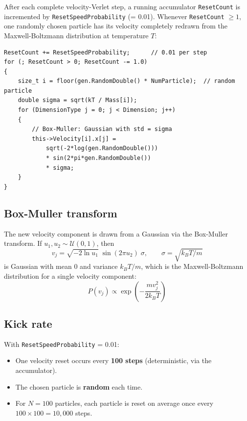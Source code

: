 \documentclass[12pt,a4paper]{article}
\begin{document}
After each complete velocity-Verlet step, a running accumulator
\texttt{ResetCount} is incremented by \texttt{ResetSpeedProbability} (= 0.01).
Whenever \texttt{ResetCount} $\geq 1$, one randomly chosen particle has
its velocity completely redrawn from the Maxwell-Boltzmann distribution
at temperature $T$:

\begin{lstlisting}
ResetCount += ResetSpeedProbability;      // 0.01 per step
for (; ResetCount > 0; ResetCount -= 1.0)
{
    size_t i = floor(gen.RandomDouble() * NumParticle);  // random particle
    double sigma = sqrt(kT / Mass[i]);
    for (DimensionType j = 0; j < Dimension; j++)
    {
        // Box-Muller: Gaussian with std = sigma
        this->Velocity[i].x[j] =
            sqrt(-2*log(gen.RandomDouble()))
            * sin(2*pi*gen.RandomDouble())
            * sigma;
    }
}
\end{lstlisting}

\subsection{Box-Muller transform}

The new velocity component is drawn from a Gaussian via the Box-Muller
transform. If $u_1, u_2 \sim \mathcal{U}(0,1)$, then
\begin{equation}
    v_j = \sqrt{-2\ln u_1}\;\sin(2\pi u_2)\;\sigma,
    \qquad \sigma = \sqrt{k_BT/m}
\end{equation}
is Gaussian with mean 0 and variance $k_BT/m$, which is the Maxwell-Boltzmann
distribution for a single velocity component:
\begin{equation}
    P(v_j) \propto \exp\!\left(-\frac{m v_j^2}{2k_BT}\right)
\end{equation}

\subsection{Kick rate}

With \texttt{ResetSpeedProbability} = 0.01:
\begin{itemize}
    \item One velocity reset occurs every \textbf{100 steps} (deterministic,
          via the accumulator).
    \item The chosen particle is \textbf{random} each time.
    \item For $N = 100$ particles, each particle is reset on average once
          every $100 \times 100 = 10{,}000$ steps.
\end{itemize}
\end{document}
